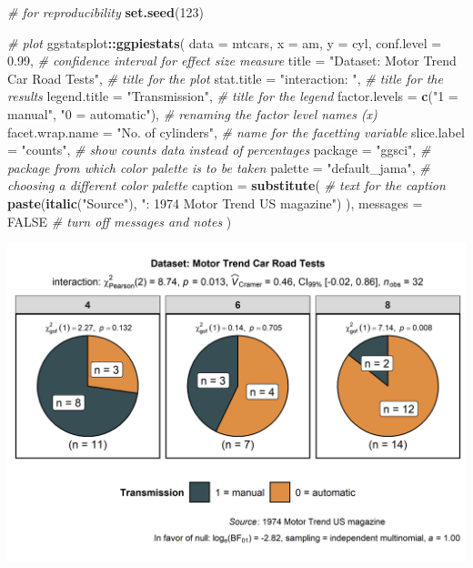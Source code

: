 \documentclass[
]{article}
\newenvironment{Shaded}{\begin{snugshade}}{\end{snugshade}}
\newcommand{\CommentTok}[1]{\textcolor[rgb]{0.56,0.35,0.01}{\textit{#1}}}
\newcommand{\DataTypeTok}[1]{\textcolor[rgb]{0.13,0.29,0.53}{#1}}
\newcommand{\DecValTok}[1]{\textcolor[rgb]{0.00,0.00,0.81}{#1}}
\newcommand{\FloatTok}[1]{\textcolor[rgb]{0.00,0.00,0.81}{#1}}
\newcommand{\KeywordTok}[1]{\textcolor[rgb]{0.13,0.29,0.53}{\textbf{#1}}}
\newcommand{\NormalTok}[1]{#1}
\newcommand{\OperatorTok}[1]{\textcolor[rgb]{0.81,0.36,0.00}{\textbf{#1}}}
\newcommand{\OtherTok}[1]{\textcolor[rgb]{0.56,0.35,0.01}{#1}}
\newcommand{\StringTok}[1]{\textcolor[rgb]{0.31,0.60,0.02}{#1}}
\begin{document}
\begin{Shaded}
\begin{Highlighting}[]
\CommentTok{\# for reproducibility}
\KeywordTok{set.seed}\NormalTok{(}\DecValTok{123}\NormalTok{)}

\CommentTok{\# plot}
\NormalTok{ggstatsplot}\OperatorTok{::}\KeywordTok{ggpiestats}\NormalTok{(}
  \DataTypeTok{data =}\NormalTok{ mtcars,}
  \DataTypeTok{x =}\NormalTok{ am,}
  \DataTypeTok{y =}\NormalTok{ cyl,}
  \DataTypeTok{conf.level =} \FloatTok{0.99}\NormalTok{, }\CommentTok{\# confidence interval for effect size measure}
  \DataTypeTok{title =} \StringTok{"Dataset: Motor Trend Car Road Tests"}\NormalTok{, }\CommentTok{\# title for the plot}
  \DataTypeTok{stat.title =} \StringTok{"interaction: "}\NormalTok{, }\CommentTok{\# title for the results}
  \DataTypeTok{legend.title =} \StringTok{"Transmission"}\NormalTok{, }\CommentTok{\# title for the legend}
  \DataTypeTok{factor.levels =} \KeywordTok{c}\NormalTok{(}\StringTok{"1 = manual"}\NormalTok{, }\StringTok{"0 = automatic"}\NormalTok{), }\CommentTok{\# renaming the factor level names (\textasciigrave{}x\textasciigrave{})}
  \DataTypeTok{facet.wrap.name =} \StringTok{"No. of cylinders"}\NormalTok{, }\CommentTok{\# name for the facetting variable}
  \DataTypeTok{slice.label =} \StringTok{"counts"}\NormalTok{, }\CommentTok{\# show counts data instead of percentages}
  \DataTypeTok{package =} \StringTok{"ggsci"}\NormalTok{, }\CommentTok{\# package from which color palette is to be taken}
  \DataTypeTok{palette =} \StringTok{"default\_jama"}\NormalTok{, }\CommentTok{\# choosing a different color palette}
  \DataTypeTok{caption =} \KeywordTok{substitute}\NormalTok{( }\CommentTok{\# text for the caption}
    \KeywordTok{paste}\NormalTok{(}\KeywordTok{italic}\NormalTok{(}\StringTok{"Source"}\NormalTok{), }\StringTok{": 1974 Motor Trend US magazine"}\NormalTok{)}
\NormalTok{  ),}
  \DataTypeTok{messages =} \OtherTok{FALSE} \CommentTok{\# turn off messages and notes}
\NormalTok{)}
\end{Highlighting}
\end{Shaded}

\includegraphics[width=1\linewidth]{./figures/paper-ggpiestats2-1}
\end{document}
